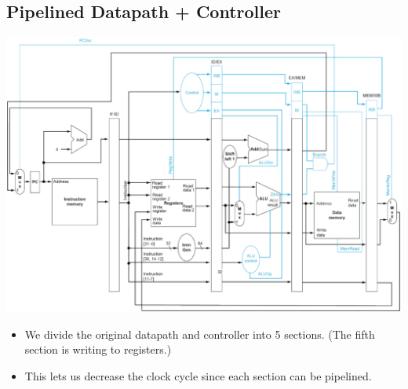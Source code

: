 \documentclass[10pt]{article}
\begin{document}
\subsection*{Pipelined Datapath + Controller}
\begin{center}
    \includegraphics*[scale=0.5]{W3_5.png}
\end{center}
\begin{itemize}
    \item We divide the original datapath and controller into 5 sections.  (The fifth section is writing to registers.)
    \item This lets us decrease the clock cycle since each section can be pipelined.
\end{itemize}
\end{document}
